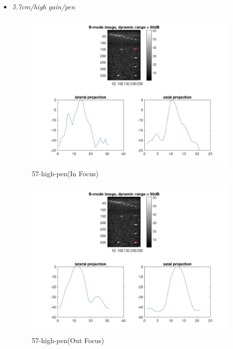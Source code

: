 \documentclass[12pts,a4paper]{article}
\begin{document}
\pagebreak
\begin{itemize}
\item{\emph{5.7cm/high gain/pen}}
\begin{center}
\end{center}
\begin{figure}[h]
    \centering
    \includegraphics[width=1.0\textwidth]{img_hw1/57-high-pen1.jpg}
    \caption{57-high-pen(In Focus)}
    \label{fig:mesh1}
\end{figure}
\pagebreak
\begin{figure}[h]
    \centering
    \includegraphics[width=1.0\textwidth]{img_hw1/57-high-pen2.jpg}
    \caption{57-high-pen(Out Focus)}
    \label{fig:mesh1}
\end{figure}
\pagebreak


\end{itemize}
\end{document}
